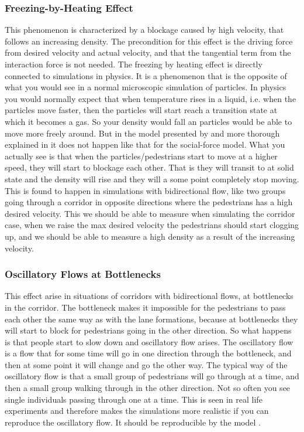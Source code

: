 \subsubsection{Freezing-by-Heating Effect}
This phenomenon is characterized by a blockage caused by high velocity,
that follows an increasing density. The precondition for this effect is the driving force from desired 
velocity and actual velocity, and that the tangential term from the interaction 
force is not needed. The freezing by heating effect is directly connected to simulations in
physics\cite{frebyheat}. It is a  phenomenon that is the opposite of what you would see in a
normal microscopic simulation of particles. In physics you would normally expect that when
temperature rises in a liquid, i.e. when the particles move faster, then the particles will
start reach a transition state at which it becomes a gas. So your density would fall an
particles would be able to move more freely around.
But in the model presented by \cite{self-org} and more thorough explained in \cite{frebyheat}
it does not happen like that for the social-force model. What you actually see is that when the
particles/pedestrians start to move at a higher speed, they will start to blockage each other.
That is they will transit to at solid state and the density will rise and they will a some point
completely stop moving. This is found to happen in simulations with bidirectional flow, like
two groups going through a corridor in opposite directions where the pedestrians has a high desired velocity.
This we should be able to measure when simulating the corridor case, when we raise the max desired
velocity the pedestrians should start clogging up, and we should be able to measure a high density as
a result of the increasing velocity.
        

\subsubsection{Oscillatory Flows at Bottlenecks}
This effect arise in situations of corridors with bidirectional flows, at bottlenecks in the corridor.
The bottleneck makes it impossible for the pedestrians
to pass each other the same way as with the lane formations, because at bottlenecks they will
start to block for pedestrians going in the other direction.
So what happens is that people start to slow down and oscillatory
flow arises. The oscillatory flow is a flow that for some time will go in one direction through
the bottleneck, and then at some point it will change and go the other way. The typical way of
the oscillatory flow is that a small group of pedestrians will go through at a time, and then
a small group walking through in the other direction.
Not so often you see single individuals passing through one at a time.
This is seen in real life experiments and therefore makes the simulations more realistic
if you can reproduce the oscillatory flow.
It should be reproducible by the model \cite{self-org}.

